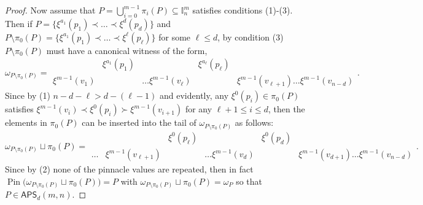 \documentclass[10pt,a4paper]{amsart}
\newcommand\APS{\mathsf{APS}}
\newcommand{\I}{\mathbb{I}}
\newcommand{\Pin}{\operatorname{Pin}}
\begin{document}
\begin{proof}
Now assume that $P=\bigcup_{i=0}^{m-1}\pi_i(P) \subseteq \I_n^m$ satisfies conditions (1)-(3).
Then if $P = \{ \xi^{a_1}(p_1)\prec \dots \prec \xi^{d}(p_d)\}$ and $P\setminus \pi_0(P) = \{ \xi^{a_1}(p_1)\prec \dots \prec \xi^{\ell}(p_{\ell})\}$ for some $\ell\leq d$, by condition (3) $P\setminus \pi_0(P)$ must have a canonical witness of the form, 
\begin{equation}\label{eq:smallwitness} 
\omega_{P\setminus\pi_0(P)}=\begin{matrix}&\xi^{a_1}(p_1)&&\xi^{a_\ell}(p_{\ell})\\
\xi^{m-1}(v_1)&& \dots \xi^{m-1}(v_{\ell})&& \xi^{m-1}(v_{\ell+1})\dots \xi^{m-1}(v_{n-d})
\end{matrix}. 
\end{equation}
Since by (1) $n-d-\ell > d-(\ell-1)$ and evidently, any $\xi^0(p_i) \in \pi_0(P)$ satisfies $\xi^{m-1}(v_i) \prec \xi^0(p_i) \succ \xi^{m-1}(v_{i+1})$ for any $\ell+1\leq i \leq d$, then the elements in $\pi_0(P)$ can be inserted into the tail of $\omega_{P\setminus\pi_0(P)}$ as follows: 
\begin{equation*}
\omega_{P\setminus\pi_0(P)}\sqcup \pi_0(P)=\begin{matrix}&&\xi^{0}(p_\ell)&&\xi^{0}(p_{d})
\\
\dots&\xi^{m-1}(v_{\ell+1})&& \dots \xi^{m-1}(v_{d})&& \xi^{m-1}(v_{d+1})\dots \xi^{m-1}(v_{n-d})
\end{matrix}. 
\end{equation*}
Since by (2) none of the pinnacle values are repeated, then in fact $\Pin\Big(\omega_{P\setminus\pi_0(P)}\sqcup \pi_0(P)\Big) =P$ with
$\omega_{P\setminus\pi_0(P)}\sqcup \pi_0(P) = \omega_P$ so that $P \in \APS_d(m,n)$.


\end{proof}
\end{document}
